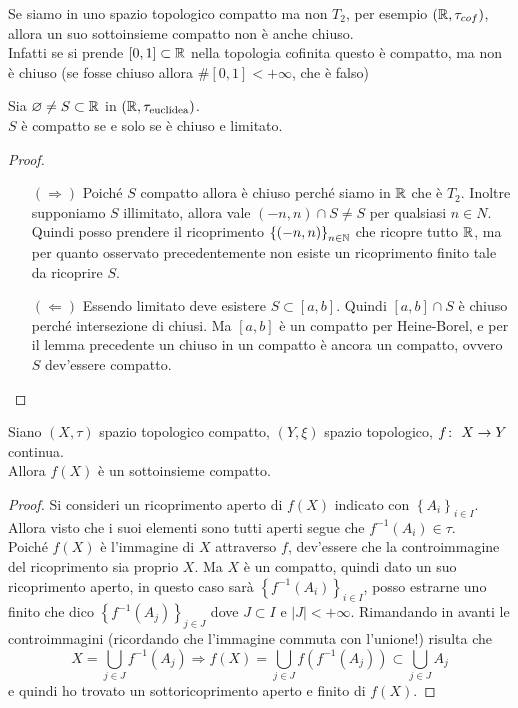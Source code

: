 \begin{remark}
	Se siamo in uno spazio topologico compatto ma non $T_2$, per esempio $(\mathbb{R}, \tau_{cof})$, allora un suo sottoinsieme compatto non è anche chiuso. \\ Infatti se si prende $\left[0,1\right] \subset \mathbb{R}$ nella topologia cofinita questo è compatto, ma non è chiuso (se fosse chiuso allora $\#\left[0,1\right] < +\infty$, che è falso)
\end{remark}

\begin{corollary}
	Sia $\varnothing \neq S \subset \mathbb{R}$ in $(\mathbb{R}, \tau_{\text{euclidea}})$. \\ $S$ è compatto se e solo se è chiuso e limitato. 
\end{corollary} 
\begin{proof}
	\begin{enumerate}
		\item[$(\Rightarrow)$] Poiché $S$ compatto allora è chiuso perché siamo in $\mathbb{R}$ che è $T_2$. Inoltre supponiamo $S$ illimitato, allora vale $(-n, n) \cap S \neq S$ per qualsiasi $n \in N$. Quindi posso prendere il ricoprimento $\left\{(-n,n)\right\}_{n\in \mathbb{N}}$ che ricopre tutto $\mathbb{R}$, ma per quanto osservato precedentemente non esiste un ricoprimento finito tale da ricoprire $S$.
		\item[$(\Leftarrow)$] Essendo limitato deve esistere $S\subset \left[a,b\right]$. Quindi $\left[a,b\right] \cap S$ è chiuso perché intersezione di chiusi. Ma $\left[a,b\right]$ è un compatto per Heine-Borel, e per il lemma precedente un chiuso in un compatto è ancora un compatto, ovvero $S$ dev'essere compatto.
	\end{enumerate}	
\end{proof}

\begin{theorem}
	Siano $(X, \tau)$ spazio topologico compatto, $(Y, \xi)$ spazio topologico, $f \colon\ X \rightarrow Y$ continua. \\ Allora $f(X)$ è un sottoinsieme compatto. 
\end{theorem} 
\begin{proof}
	Si consideri un ricoprimento aperto di $f(X)$ indicato con $\left\{A_i\right\}_{i \in I}$. Allora visto che i suoi elementi sono tutti aperti segue che $f^{-1}(A_i) \in \tau$. \\ Poiché $f(X)$ è l'immagine di $X$ attraverso $f$, dev'essere che la controimmagine del ricoprimento sia proprio $X$. Ma $X$ è un compatto, quindi dato un suo ricoprimento aperto, in questo caso sarà $\left\{f^{-1}(A_i)\right\}_{i \in I}$, posso estrarne uno finito che dico $\left\{f^{-1}(A_j)\right\}_{j \in J}$ dove $J \subset I$ e $|J| < +\infty$. Rimandando in avanti le controimmagini (ricordando che l'immagine commuta con l'unione!) risulta che
	\begin{equation*}
		X = \bigcup_{j \in J} f^{-1}(A_j) \Longrightarrow f(X) = \bigcup_{j \in J} f(f^{-1}(A_j)) \subset \bigcup_{j \in J} A_j
	\end{equation*}
	e quindi ho trovato un sottoricoprimento aperto e finito di $f(X)$.
\end{proof}

